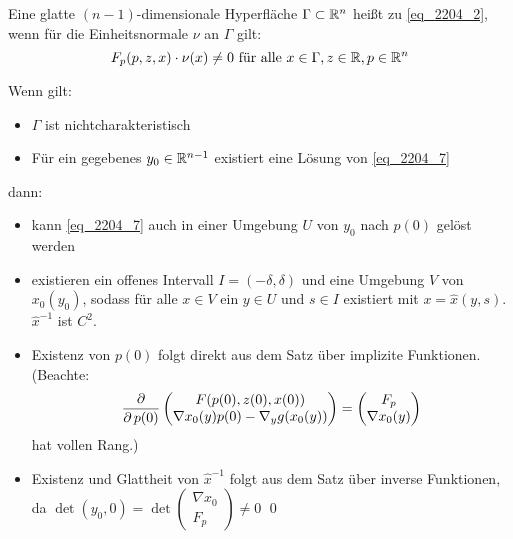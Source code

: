 \begin{defn} \label{def_nichtchar} \label{def_5}
	Eine glatte $(n-1)$-dimensionale Hyperfläche\marginnote{[5]} $\Gamma \subset \mathbb{R}^n$ heißt  zu \eqref{eq_2204_2}, wenn für die Einheitsnormale $\nu$ an $\Gamma$ gilt:
	\[ F_p(p,z,x) \cdot \nu(x) \neq 0 \text{ für alle } x \in \Gamma, z \in \mathbb{R}, p \in \mathbb{R}^n \]
\end{defn}
	
\begin{lemma} \label{lemma_6}
	Wenn gilt: \marginnote{[6]} \begin{itemize}
	\item $\Gamma$ ist nichtcharakteristisch
	\item Für ein gegebenes $y_0 \in \mathbb{R}^{n-1}$ existiert eine Lösung von \eqref{eq_2204_7}
	\end{itemize}
	dann: \begin{itemize}
		\item kann \eqref{eq_2204_7} auch in einer Umgebung $U$ von $y_0$ nach $p(0)$ gelöst werden
		\item existieren ein offenes Intervall $I = (-\delta,\delta)$ und eine Umgebung $V$ von $x_0(y_0)$, sodass für alle $x \in V$ ein $y \in U$ und $s \in I$ existiert mit $x = \widehat{x}(y,s)$. $\widehat{x}^{-1}$ ist $C^2$.
	\end{itemize}
\end{lemma}
	
	\begin{itemize}
		\item Existenz von $p(0)$ folgt direkt aus dem Satz über implizite Funktionen. (Beachte:
		\[ \frac{\operatorname{\partial}}{\operatorname{\partial} p(0)} \begin{pmatrix}
		F(p(0),z(0),x(0)) \\ \nabla x_0 (y) p(0) - \nabla_y g(x_0(y)) \end{pmatrix} = \begin{pmatrix}
		F_p \\ \nabla x_0 (y) \end{pmatrix} \]
		hat vollen Rang.)
		\item Existenz und Glattheit von $\widehat{x}^{-1}$ folgt aus dem Satz über inverse Funktionen, da $\det (y_0,0) = \det \begin{pmatrix}	\nabla x_0 \\ F_p \end{pmatrix} \neq 0$ \qed
	\end{itemize}
	
